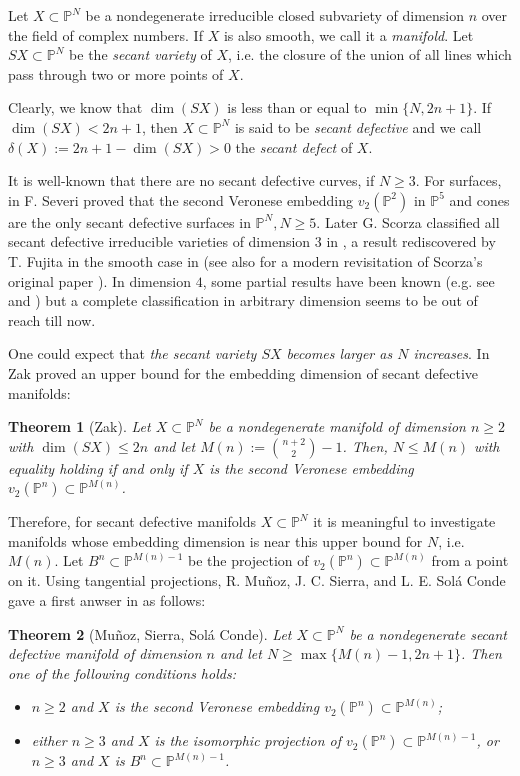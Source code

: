\documentclass[11pt]{amsart}
\def\P{{\mathbb P}}
\theoremstyle{theorem} %
\newtheorem{Thm}{Theorem}[section]
\theoremstyle{definition}
\numberwithin{equation}{section}
\begin{document}
Let $X\subset \P^N$ be a nondegenerate irreducible closed subvariety of dimension $n$ over the field of complex numbers. If $X$ is also smooth, we call it a \textit{manifold}. Let $SX\subset\P^N$ be the \textit{secant variety} of $X$, i.e. the closure of the union of all lines which pass through two or more points of $X$. 

Clearly, we know that $\dim(SX)$ is less than or equal to $\min\{N,2n+1\}$. If $\dim(SX)<2n+1$, then $X\subset\P^N$ is said to be \textit{secant defective} and we call $\delta(X):=2n+1-\dim(SX)>0$ the \textit{secant defect} of $X$. 

It is well-known that there are no secant defective curves, if $N\ge3$. For surfaces, in \cite{Sev} F. Severi proved that the second Veronese embedding $v_2(\P^2)$ in $\P^5$ and cones are the only secant defective surfaces in $\P^N, N\ge5$. Later G. Scorza classified all secant defective irreducible varieties of dimension $3$ in \cite{Sco}, a result rediscovered by T. Fujita in the smooth case in \cite{F} (see also \cite{CC1} for a modern revisitation of Scorza's original paper \cite{Sco}). In dimension $4$, some partial results have been known (e.g. see \cite{Sco1} and \cite{FR}) but a complete classification in arbitrary dimension seems to be out of reach till now.

One could expect that \textit{the secant variety $SX$ becomes larger as $N$ increases}. In \cite{Z1} Zak proved an upper bound for the embedding dimension of secant defective manifolds:



\begin{Thm}[Zak]
Let $X\subset \P^N$ be a nondegenerate manifold of dimension $n\ge2$ with $\dim(SX)\le2n$ and let $M(n):={n+2 \choose 2}-1$. Then, $N\le M(n)$ with equality holding if and only if $X$ is the second Veronese embedding $v_2(\P^n)\subset\P^{M(n)}$.
\end{Thm}

Therefore, for secant defective manifolds $X\subset \P^N$ it is meaningful to investigate manifolds whose embedding dimension is near this upper bound for $N$, i.e. $M(n)$. Let $B^n\subset\P^{M(n)-1}$ be the projection of $v_2(\P^n)\subset\P^{M(n)}$ from a point on it. Using tangential projections, R. Mu\~noz, J. C. Sierra, and L. E. Sol\'a Conde gave a first anwser in \cite{MSS} as follows:

\begin{Thm}[Mu\~noz, Sierra, Sol\'a Conde]\label{MSC}
Let $X\subset \P^N$ be a nondegenerate secant defective manifold of dimension $n$ and let $N\ge\max\{M(n)-1,2n+1\}$. Then one of the following conditions holds:
\begin{itemize}
\item[(a)] $n\ge2$ and $X$ is the second Veronese embedding $v_2(\P^n)\subset\P^{M(n)}$;
\item[(b)] either $n\ge3$ and $X$ is the isomorphic projection of $v_2(\P^n)\subset\P^{M(n)-1}$, or $n\ge3$ and $X$ is $B^n\subset\P^{M(n)-1}$.
\end{itemize}
\end{Thm}
\end{document}
